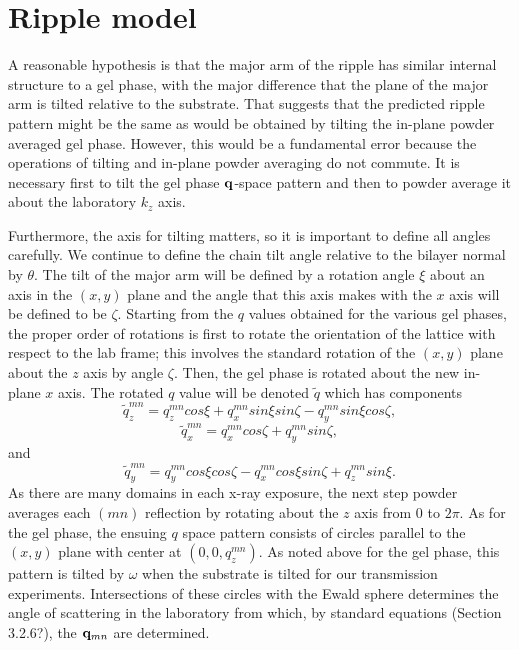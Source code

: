 \documentclass[
 preprint,
 showkeys, 
 amsmath,
 amssymb,
 aps,
]{revtex4-1}
\begin{document}
\section{Ripple model}
A reasonable hypothesis is that the major arm of the ripple has similar internal structure to a gel phase, with the major   difference that the plane of the major arm is tilted relative to the substrate.  That suggests that the predicted ripple pattern might be the same as would be obtained by tilting the in-plane powder averaged gel phase.  However, this would be a fundamental error because the operations of tilting and in-plane powder averaging do not commute.  It is necessary first to tilt the gel phase $\bold{q}$-space pattern and then to powder average it about the laboratory $k_z$ axis.  

Furthermore, the axis for tilting matters, so it is important to define all angles carefully.  We continue to define the chain tilt angle relative to the bilayer normal by $\theta$.  The tilt of the major arm will be defined by a rotation angle $\xi$ about an axis in the $(x,y)$ plane and the angle that this axis makes with the $x$ axis will be defined to be $\zeta$.  Starting from the $q$ values obtained for the various gel phases, the proper order of rotations is first to rotate the orientation of the lattice with respect to the lab frame; this involves the standard rotation of the $(x,y)$ plane about the $z$ axis by angle $\zeta$.  Then, the gel phase is rotated about the new in-plane $x$ axis. The rotated $q$ value will be denoted $\tilde{q}$ which has components
\begin{equation}\label{qtz}
\tilde{q}_{z}^{mn}=q_{z}^{mn}cos{\xi}+q_{x}^{mn}sin{\xi}sin{\zeta}-q_{y}^{mn}sin{\xi}cos{\zeta},
\end{equation}
\begin{equation}\label{qtx}
\tilde{q}_{x}^{mn}=q_{x}^{mn}cos{\zeta}+q_{y}^{mn}sin{\zeta},
\end{equation}
and
\begin{equation}\label{qty}
\tilde{q}_{y}^{mn}=q_{y}^{mn}cos{\xi}cos{\zeta}-q_{x}^{mn}cos{\xi}sin{\zeta}+q_{z}^{mn}sin{\xi}.
\end{equation}
As there are many domains in each x-ray exposure, the next step powder averages each $(mn)$ reflection by rotating about the $z$ axis from $0$ to $2\pi$.  As for the gel phase, the ensuing $q$ space pattern consists of circles parallel to the $(x,y)$ plane with center at $(0,0,q_z^{mn})$.  As noted above for the gel phase, this pattern is tilted by $\omega$ when the substrate is tilted for our transmission experiments.  Intersections of these circles with the Ewald sphere determines the angle of scattering in the laboratory from which, by standard equations (Section 3.2.6?), the $\bold{q}_{mn}$ are determined.  
\end{document}
